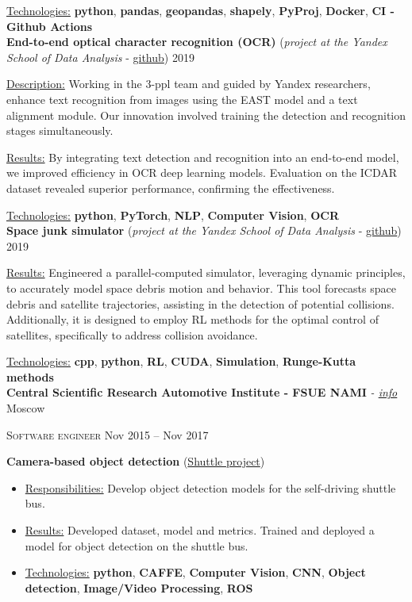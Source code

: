 \documentclass[12pt, a4paper]{extarticle}
\newcommand{\mymk}[1]{\textbf{#1}}
\newcommand{\placeheadding}[3]{\textbf{#1} \textit{#2} \hfill #3\null}
\newcommand{\positionheading}[2]{\par\noindent \textsc{#1} \hfill #2}
\begin{document}
\underline{Technologies:} \mymk{python}, \mymk{pandas}, \mymk{geopandas}, \mymk{shapely}, \mymk{PyProj}, \mymk{Docker}, \mymk{CI - Github Actions}
\\
\textbf{End-to-end optical character recognition (OCR)} (\textit{project at the Yandex School of Data Analysis} - \href{https://github.com/neer201/end2end_OCR}{github})  \hfill 2019
\par
\underline{Description:} Working in the 3-ppl team and guided by Yandex researchers, enhance text recognition from images using the EAST model and a text alignment module. Our innovation involved training the detection and recognition stages simultaneously.

\underline{Results:} By integrating text detection and recognition into an end-to-end model, we improved efficiency in OCR deep learning models. Evaluation on the ICDAR dataset revealed superior performance, confirming the effectiveness.

\underline{Technologies:} \mymk{python}, \mymk{PyTorch}, \mymk{NLP}, \mymk{Computer Vision}, \mymk{OCR}
\\
\textbf{Space junk simulator} (\textit{project at the Yandex School of Data Analysis} - \href{https://github.com/neer201/space_junk_simulator}{github})   \hfill 2019
\par
\underline{Results:} Engineered a parallel-computed simulator, leveraging dynamic principles, to accurately model space debris motion and behavior. This tool forecasts space debris and satellite trajectories, assisting in the detection of potential collisions. Additionally, it is designed to employ RL methods for the optimal control of satellites, specifically to address collision avoidance.

\underline{Technologies:} \mymk{cpp}, \mymk{python}, \mymk{RL}, \mymk{CUDA}, \mymk{Simulation}, \mymk{Runge-Kutta methods}
% 
\pagebreak
\\
\placeheadding{Central Scientific Research Automotive Institute - FSUE NAMI}{- \href{https://nami.ru/en/}{info}}{Moscow}
\positionheading{Software engineer}{Nov 2015 -- Nov 2017}

\textbf{Camera-based object detection} (\href{https://www.engadget.com/2016/08/28/yandex-teams-on-self-driving-shuttle-bus/}{Shuttle project})
\begin{itemize}
	\item[] \underline{Responsibilities:} Develop object detection models for the self-driving shuttle bus.
	\item[] \underline{Results:} Developed dataset, model and metrics. Trained and deployed a model for object detection on the shuttle bus.
	\item[] \underline{Technologies:}  \mymk{python}, \mymk{CAFFE}, \mymk{Computer Vision}, \mymk{CNN}, \mymk{Object detection}, \mymk{Image/Video Processing}, \mymk{ROS}
\end{itemize}
\end{document}
